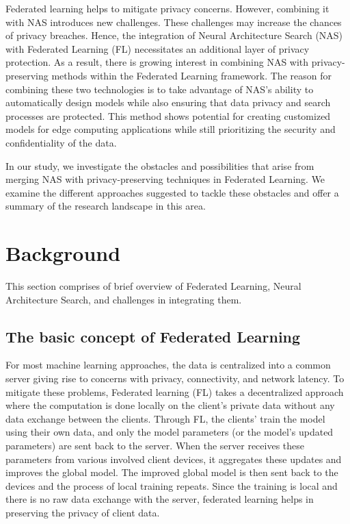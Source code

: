 \documentclass[conference]{IEEEtran}
\begin{document}
Federated learning helps to mitigate privacy concerns. However, combining it with NAS introduces new challenges. These challenges may increase the chances of privacy breaches. Hence, the integration of Neural Architecture Search (NAS) with Federated Learning (FL) necessitates an additional layer of privacy protection. 
As a result, there is growing interest in combining NAS with privacy-preserving methods within the Federated Learning framework.
The reason for combining these two technologies is to take advantage of NAS's ability to automatically design models while also ensuring that data privacy and search processes are protected. This method shows potential for creating customized models for edge computing applications while still prioritizing the security and confidentiality of the data.

In our study, we investigate the obstacles and possibilities that arise from merging NAS with privacy-preserving techniques in Federated Learning. We examine the different approaches suggested to tackle these obstacles and offer a summary of the research landscape in this area.




\section{Background}
This section comprises of brief overview of Federated Learning, Neural Architecture Search, and challenges in integrating them. 
\subsection{The basic concept of Federated Learning} %
For most machine learning approaches, the data is centralized into a common server giving rise to concerns with privacy, connectivity, and network latency. To mitigate these problems, Federated learning (FL) takes a decentralized approach where the computation is done locally on the client’s private data without any data exchange between the clients. Through FL, the clients’ train the model using their own data, and only the model parameters (or the model’s updated parameters) are sent back to the server. When the server receives these parameters from various involved client devices, it aggregates these updates and improves the global model. The improved global model is then sent back to the devices and the process of local training repeats. Since the training is local and there is no raw data exchange with the server, federated learning helps in preserving the privacy of client data. 
\end{document}
